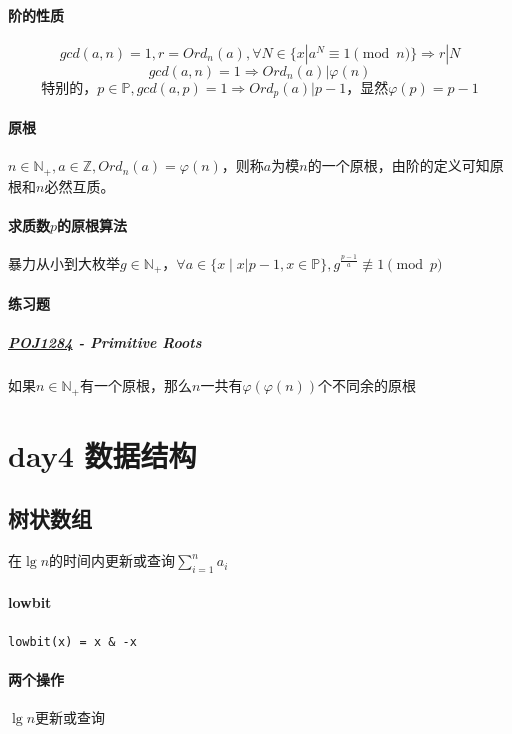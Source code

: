 \documentclass[]{cpp}
\begin{document}
\paragraph{阶的性质}
	$$gcd(a,n)=1,r=Ord_n(a),\forall N\in\{x|a^N\equiv1\pmod{n}\}\Rightarrow r|N$$
	$$gcd(a,n)=1\Rightarrow Ord_n(a)|\varphi(n)$$
	$$\mbox{特别的，}p\in\mathbb{P},gcd(a,p)=1\Rightarrow Ord_p(a)|p-1\mbox{，显然}\varphi(p)=p-1$$
\paragraph{原根} $n\in\mathbb{N_+},a\in\mathbb{Z},Ord_n(a)=\varphi(n)$，则称$a$为模$n$的一个原根，由阶的定义可知原根和$n$必然互质。
\paragraph{求质数$p$的原根算法} 暴力从小到大枚举$g\in\mathbb{N_+}$，$\forall a\in\{x\;|\;x|p-1,x\in\mathbb{P}\},g^{\frac{p-1}{a}}\not\equiv1\pmod{p}$
\paragraph{练习题}
\subparagraph{\href{http://poj.org/problem?id=1284}{POJ1284} - Primitive Roots} 如果$n\in\mathbb{N_+}$有一个原根，那么$n$一共有$\varphi(\varphi(n))$个不同余的原根
\section{day4 数据结构}
\subsection{树状数组} 在$\lg{n}$的时间内更新或查询$\sum\limits_{i=1}^n a_i$
\paragraph{lowbit} \verb|lowbit(x) = x & -x|
\paragraph{两个操作} $\lg{n}$更新或查询
\end{document}
